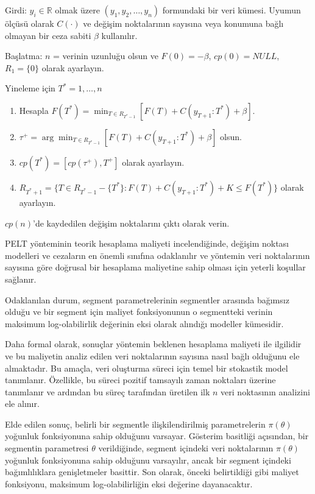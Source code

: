 \documentclass[12pt,twoside]{deuthesis}
\begin{document}
Girdi: \(y_i \in \mathbb{R}\) olmak üzere \((y_1, y_2, \ldots, y_n)\) formundaki bir veri kümesi. Uyumun ölçüsü olarak \(C(\cdot)\) ve değişim noktalarının sayısına veya konumuna bağlı olmayan bir ceza sabiti \(\beta\) kullanılır.

Başlatma: \(n\) = verinin uzunluğu olsun ve \(F(0) = -\beta\), \(cp(0) = NULL\), \(R_1 = \{0\}\) olarak ayarlayın.

Yineleme için \(T^* = 1, \ldots, n\)

\begin{enumerate}
\def\labelenumi{\arabic{enumi}.}
\item
  Hesapla \(F(T^*) = \min_{T \in R_{T^*-1}} [F(T) + C(y_{T+1}:T^*) + \beta]\).
\item
  \(\tau^+ = \arg \min_{T \in R_{T^*-1}} [F(T) + C(y_{T+1}:T^*) + \beta]\) olsun.
\item
  \(cp(T^*) = [cp(\tau^+), T^+]\) olarak ayarlayın.
\item
  \(R_{T^*+1} = \{T \in R_{T^*-1} - \{T^*\} : F(T) + C(y_{T+1}:T^*) + K \leq F(T^*)\}\) olarak ayarlayın.
\end{enumerate}

\(cp(n)\)'de kaydedilen değişim noktalarını çıktı olarak verin.

PELT yönteminin teorik hesaplama maliyeti incelendiğinde, değişim noktası modelleri ve cezaların en önemli sınıfına odaklanılır ve yöntemin veri noktalarının sayısına göre doğrusal bir hesaplama maliyetine sahip olması için yeterli koşullar sağlanır.

Odaklanılan durum, segment parametrelerinin segmentler arasında bağımsız olduğu ve bir segment için maliyet fonksiyonunun o segmentteki verinin maksimum log-olabilirlik değerinin eksi olarak alındığı modeller kümesidir.

Daha formal olarak, sonuçlar yöntemin beklenen hesaplama maliyeti ile ilgilidir ve bu maliyetin analiz edilen veri noktalarının sayısına nasıl bağlı olduğunu ele almaktadır. Bu amaçla, veri oluşturma süreci için temel bir stokastik model tanımlanır. Özellikle, bu süreci pozitif tamsayılı zaman noktaları üzerine tanımlanır ve ardından bu süreç tarafından üretilen ilk \(n\) veri noktasının analizini ele alınır.

Elde edilen sonuç, belirli bir segmentle ilişkilendirilmiş parametrelerin \(\pi(\theta)\) yoğunluk fonksiyonuna sahip olduğunu varsayar. Gösterim basitliği açısından, bir segmentin parametresi \(\theta\) verildiğinde, segment içindeki veri noktalarının \(\pi(\theta)\) yoğunluk fonksiyonuna sahip olduğunu varsayılır, ancak bir segment içindeki bağımlılıklara genişletmeler basittir. Son olarak, önceki belirtildiği gibi maliyet fonksiyonu, maksimum log-olabilirliğin eksi değerine dayanacaktır.
\end{document}
